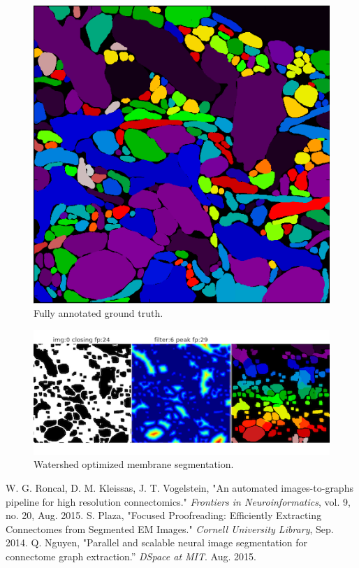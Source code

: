 \documentclass[11pt]{article}
\begin{document}
\begin{figure}
	\includegraphics{truth_anno1}
	\caption{Fully annotated ground truth.}
\end{figure}

\begin{figure}
	\includegraphics{fig_0_24_6_29}
	\caption{Watershed optimized membrane segmentation.}
\end{figure}


\begin{thebibliography}{1}
 W. G. Roncal, D. M. Kleissas, J. T. Vogelstein, "An automated images-to-graphs pipeline for high resolution connectomics." \textit{Frontiers in Neuroinformatics}, vol. 9, no. 20, Aug. 2015.
 S. Plaza, "Focused Proofreading: Efficiently Extracting Connectomes from Segmented EM Images." \textit{Cornell University Library}, Sep. 2014.
 Q. Nguyen,  "Parallel and scalable neural image segmentation for connectome graph extraction.” \textit{DSpace at MIT}. Aug. 2015.
\end{thebibliography}
\end{document}
